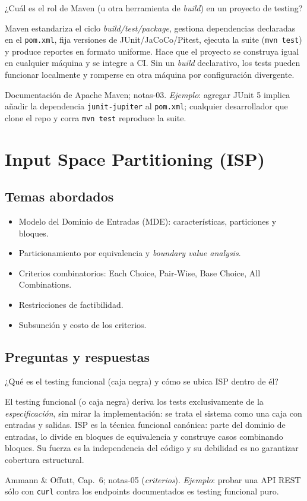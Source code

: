 \documentclass[11pt,a4paper]{article}
\newcounter{preg}
\newcommand{\qa}[3]{%
  \stepcounter{preg}%
  \vspace{0.4em}
  \begin{preguntabox}{\thepreg}
  #1
  \end{preguntabox}
  \begin{respuestabox}
  #2
  \end{respuestabox}
  \begin{refbox}
  #3
  \end{refbox}
  \vspace{0.6em}
}
\begin{document}
\qa{¿Cuál es el rol de Maven (u otra herramienta de \emph{build}) en un proyecto de testing?}
{Maven estandariza el ciclo \emph{build/test/package}, gestiona dependencias declaradas en el \texttt{pom.xml}, fija versiones de JUnit/JaCoCo/Pitest, ejecuta la suite (\texttt{mvn test}) y produce reportes en formato uniforme. Hace que el proyecto se construya igual en cualquier máquina y se integre a CI. Sin un \emph{build} declarativo, los tests pueden funcionar localmente y romperse en otra máquina por configuración divergente.}
{Documentación de Apache Maven; notas-03. \emph{Ejemplo}: agregar JUnit 5 implica añadir la dependencia \texttt{junit-jupiter} al \texttt{pom.xml}; cualquier desarrollador que clone el repo y corra \texttt{mvn test} reproduce la suite.}

\section{Input Space Partitioning (ISP)}

\subsection*{Temas abordados}
\begin{itemize}[leftmargin=1.4em]
  \item Modelo del Dominio de Entradas (MDE): características, particiones y bloques.
  \item Particionamiento por equivalencia y \emph{boundary value analysis}.
  \item Criterios combinatorios: Each Choice, Pair-Wise, Base Choice, All Combinations.
  \item Restricciones de factibilidad.
  \item Subsunción y costo de los criterios.
\end{itemize}

\subsection*{Preguntas y respuestas}

\qa{¿Qué es el testing funcional (caja negra) y cómo se ubica ISP dentro de él?}
{El testing funcional (o caja negra) deriva los tests exclusivamente de la \emph{especificación}, sin mirar la implementación: se trata el sistema como una caja con entradas y salidas. ISP es la técnica funcional canónica: parte del dominio de entradas, lo divide en bloques de equivalencia y construye casos combinando bloques. Su fuerza es la independencia del código y su debilidad es no garantizar cobertura estructural.}
{Ammann \& Offutt, Cap.~6; notas-05 (\emph{criterios}). \emph{Ejemplo}: probar una API REST sólo con \texttt{curl} contra los endpoints documentados es testing funcional puro.}
\end{document}
